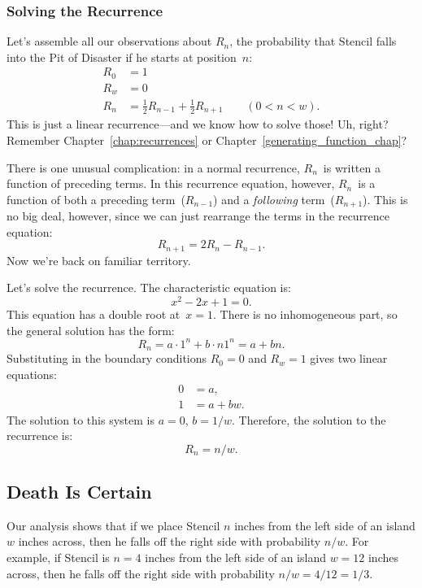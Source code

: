 \subsubsection{Solving the Recurrence}

Let's assemble all our observations about $R_n$, the probability that
Stencil falls into the Pit of Disaster if he starts at position~$n$:
%
\begin{align*}
R_0 & = 1 \\
R_w & = 0 \\
R_n & = \frac{1}{2} R_{n-1} + \frac{1}{2} R_{n+1} \qquad (0 < n < w).
\end{align*}
%
This is just a linear recurrence---and we know how to solve those!
Uh, right?  Remember Chapter~\ref{chap:recurrences} or
Chapter~\ref{generating_function_chap}?

There is one unusual complication: in a normal recurrence, $R_n$~is
written a function of preceding terms.  In this recurrence equation,
however, $R_n$~is a function of both a preceding term~($R_{n-1}$) and
a \emph{following} term~($R_{n+1}$).  This is no big deal, however,
since we can just rearrange the terms in the recurrence equation:
%
\[
    R_{n+1} = 2 R_n - R_{n-1}.
\]
%
Now we're back on familiar territory.

Let's solve the recurrence.  The characteristic equation is:
%
\[
    x^2 - 2 x + 1 = 0.
\]
%
This equation has a double root at~$x = 1$.  There is no inhomogeneous
part, so the general solution has the form:
%
\[
    R_n = a \cdot 1^n + b \cdot n 1^n = a + b n.
\]
%
Substituting in the boundary conditions $R_0 = 0$ and $R_w = 1$ gives
two linear equations:
%
\begin{align*}
0 & = a, \\
1 & = a + b w.
\end{align*}
%
The solution to this system is $a = 0$, $b = 1 / w$.  Therefore, the
solution to the recurrence is:
%
\[
    R_n = n / w.
\]

\subsection{Death Is Certain}

Our analysis shows that if we place Stencil $n$ inches from the left
side of an island $w$ inches across, then he falls off the right side
with probability $n / w$.  For example, if Stencil is $n = 4$ inches
from the left side of an island $w = 12$ inches across, then he falls
off the right side with probability $n / w = 4 / 12 = 1 / 3$.

